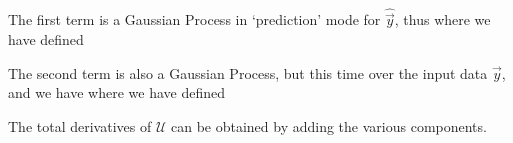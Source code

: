 \documentclass[aps,prd,showpacs,superscriptaddress,groupedaddress]{revtex4}  %
\begin{document}
The first term is a Gaussian Process in `prediction' mode for $\hat{\vec{y}}$, thus
where we have defined

The second term is also a Gaussian Process, but this time over the input data $\vec{y}$, and we have
where we have defined



The total derivatives of $\mathcal{U}$ can be obtained by adding the various components.
\end{document}
